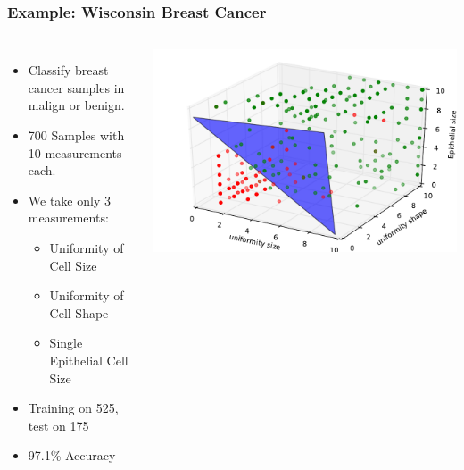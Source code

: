 \begin{frame}
    \frametitle{Example: Wisconsin Breast Cancer}
    \begin{columns}
            \begin{itemize}
                \item Classify breast cancer samples in malign or benign.
                \item 700 Samples with 10 measurements each.
                \item We take only 3 measurements:
                    \begin{itemize}
                        \item Uniformity of Cell Size
                        \item Uniformity of Cell Shape
                        \item Single Epithelial Cell Size
                    \end{itemize}
                \item Training on 525, test on 175
                \item 97.1\% Accuracy
            \end{itemize}
            \includegraphics[width=1\linewidth]{logreg-pics/wisconsin_surface}
    \end{columns}

\end{frame}

